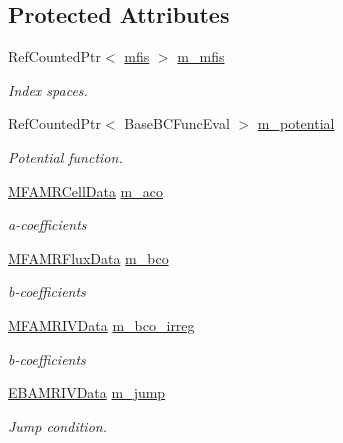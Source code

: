 \subsection*{Protected Attributes}
\begin{DoxyCompactItemize}
\item 
Ref\+Counted\+Ptr$<$ \hyperlink{classmfis}{mfis} $>$ \hyperlink{classmfconductivityopfactory_a3eb6f6794d4d44c3cb35b925752873a6}{m\+\_\+mfis}
\begin{DoxyCompactList}\small\item\em Index spaces. \end{DoxyCompactList}\item 
Ref\+Counted\+Ptr$<$ Base\+B\+C\+Func\+Eval $>$ \hyperlink{classmfconductivityopfactory_ad5f2b079d2b6b3bf4bcf3cb21609484d}{m\+\_\+potential}
\begin{DoxyCompactList}\small\item\em Potential function. \end{DoxyCompactList}\item 
\hyperlink{type__definitions_8H_aced885351d40daa466564acbee4042d3}{M\+F\+A\+M\+R\+Cell\+Data} \hyperlink{classmfconductivityopfactory_ac582c0c89ad102e64ffb6d79489b94b0}{m\+\_\+aco}
\begin{DoxyCompactList}\small\item\em a-\/coefficients \end{DoxyCompactList}\item 
\hyperlink{type__definitions_8H_a4033d82364b7e6655b58257749d7881f}{M\+F\+A\+M\+R\+Flux\+Data} \hyperlink{classmfconductivityopfactory_a31cbe6983aa783e39579604a52a28f2c}{m\+\_\+bco}
\begin{DoxyCompactList}\small\item\em b-\/coefficients \end{DoxyCompactList}\item 
\hyperlink{type__definitions_8H_a559707b00625e419df1a59d9501220de}{M\+F\+A\+M\+R\+I\+V\+Data} \hyperlink{classmfconductivityopfactory_a9ddf2f2df12ea3b01fcdc7c5d27bc91c}{m\+\_\+bco\+\_\+irreg}
\begin{DoxyCompactList}\small\item\em b-\/coefficients \end{DoxyCompactList}\item 
\hyperlink{type__definitions_8H_a6b8fa905d55cbb491b52180386f0e0c1}{E\+B\+A\+M\+R\+I\+V\+Data} \hyperlink{classmfconductivityopfactory_a2c4713a89d5bfb2cbc15b27d08e7d1a5}{m\+\_\+jump}
\begin{DoxyCompactList}\small\item\em Jump condition. \end{DoxyCompactList}\item 

\end{DoxyCompactItemize}
